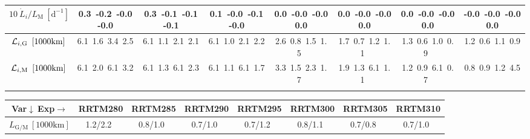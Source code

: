 \begin{table}[H]
{\begin{centering}
\begin{tabular}{|c|c|c|c|c|c|c|c|}
\hline
$10\ \dot{L}_{i}/L_{\mathrm{M}}\ \left[\mathrm{d^{-1}}\right]$ & \textcolor{C1}{0.3}\ \textcolor{C2}{-0.2}\ \textcolor{C3}{-0.0}\ \textcolor{C4}{-0.0}\  & \textcolor{C1}{0.3}\ \textcolor{C2}{-0.1}\ \textcolor{C3}{-0.1}\ \textcolor{C4}{-0.1}\  & \textcolor{C1}{0.1}\ \textcolor{C2}{-0.0}\ \textcolor{C3}{-0.1}\ \textcolor{C4}{-0.0}\  & \textcolor{C1}{0.0}\ \textcolor{C2}{-0.0}\ \textcolor{C3}{-0.0}\ \textcolor{C4}{0.0}\  & \textcolor{C1}{0.0}\ \textcolor{C2}{-0.0}\ \textcolor{C3}{-0.0}\ \textcolor{C4}{0.0}\  & \textcolor{C1}{0.0}\ \textcolor{C2}{-0.0}\ \textcolor{C3}{-0.0}\ \textcolor{C4}{0.0}\  & \textcolor{C1}{-0.0}\ \textcolor{C2}{-0.0}\ \textcolor{C3}{-0.0}\ \textcolor{C4}{0.0}\  \tabularnewline
\hline
${\cal L}_{i,\mathrm{G}}\ \left[1000\mathrm{km}\right]$ & \textcolor{C1}{6.1}\ \textcolor{C2}{1.6}\ \textcolor{C3}{3.4}\ \textcolor{C4}{2.5}\  & \textcolor{C1}{6.1}\ \textcolor{C2}{1.1}\ \textcolor{C3}{2.1}\ \textcolor{C4}{2.1}\  & \textcolor{C1}{6.1}\ \textcolor{C2}{1.0}\ \textcolor{C3}{2.1}\ \textcolor{C4}{2.2}\  & \textcolor{C1}{2.6}\ \textcolor{C2}{0.8}\ \textcolor{C3}{1.5}\ \textcolor{C4}{1.5}\  & \textcolor{C1}{1.7}\ \textcolor{C2}{0.7}\ \textcolor{C3}{1.2}\ \textcolor{C4}{1.1}\  & \textcolor{C1}{1.3}\ \textcolor{C2}{0.6}\ \textcolor{C3}{1.0}\ \textcolor{C4}{0.9}\  & \textcolor{C1}{1.2}\ \textcolor{C2}{0.6}\ \textcolor{C3}{1.1}\ \textcolor{C4}{0.9}\  \tabularnewline
\hline
${\cal L}_{i,\mathrm{M}}\ \left[1000\mathrm{km}\right]$ & \textcolor{C1}{6.1}\ \textcolor{C2}{2.0}\ \textcolor{C3}{6.1}\ \textcolor{C4}{3.2}\  & \textcolor{C1}{6.1}\ \textcolor{C2}{1.3}\ \textcolor{C3}{6.1}\ \textcolor{C4}{2.3}\  & \textcolor{C1}{6.1}\ \textcolor{C2}{1.1}\ \textcolor{C3}{6.1}\ \textcolor{C4}{1.7}\  & \textcolor{C1}{3.3}\ \textcolor{C2}{1.5}\ \textcolor{C3}{2.3}\ \textcolor{C4}{1.7}\  & \textcolor{C1}{1.9}\ \textcolor{C2}{1.3}\ \textcolor{C3}{6.1}\ \textcolor{C4}{1.1}\  & \textcolor{C1}{1.2}\ \textcolor{C2}{0.9}\ \textcolor{C3}{6.1}\ \textcolor{C4}{0.7}\  & \textcolor{C1}{0.8}\ \textcolor{C2}{0.9}\ \textcolor{C3}{1.2}\ \textcolor{C4}{4.5}\  \tabularnewline
\hline
 &  &  &  &  &  &  & \tabularnewline
\hline
\end{tabular}
\begin{tabular}{|c|c|c|c|c|c|c|c|}
\hline
Var$\downarrow\ $Exp$\rightarrow$ & RRTM280 & RRTM285 & RRTM290 & RRTM295 & RRTM300 & RRTM305 & RRTM310 \tabularnewline
\hline
\hline
$L_{\mathrm{G/M}}\ \left[1000\mathrm{km}\right]$ & 1.2/2.2\ & 0.8/1.0\ & 0.7/1.0\ & 0.7/1.2\ & 0.8/1.1\ & 0.7/0.8\ & 0.7/1.0\ \tabularnewline
\hline

\end{tabular}
\end{centering}}
\end{table}
